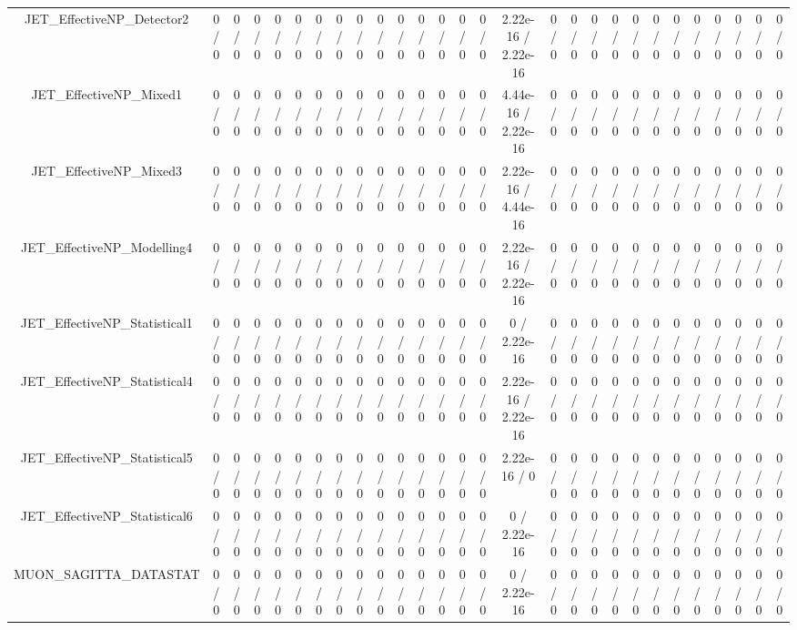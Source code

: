 \documentclass[10pt]{article}
\begin{document}
\begin{table}[htbp]
\begin{center}
\begin{tabular}{|c|c|c|c|c|c|c|c|c|c|c|c|c|c|c|c|c|c|c|c|c|c|c|c|c|c|c|c|}
  JET_EffectiveNP_Detector2 & 0 / 0 & 0 / 0 & 0 / 0 & 0 / 0 & 0 / 0 & 0 / 0 & 0 / 0 & 0 / 0 & 0 / 0 & 0 / 0 & 0 / 0 & 0 / 0 & 0 / 0 & 0 / 0 & 2.22e-16 / 2.22e-16 & 0 / 0 & 0 / 0 & 0 / 0 & 0 / 0 & 0 / 0 & 0 / 0 & 0 / 0 & 0 / 0 & 0 / 0 & 0 / 0 & 0 / 0 & 0 / 0 \\ 
  JET_EffectiveNP_Mixed1 & 0 / 0 & 0 / 0 & 0 / 0 & 0 / 0 & 0 / 0 & 0 / 0 & 0 / 0 & 0 / 0 & 0 / 0 & 0 / 0 & 0 / 0 & 0 / 0 & 0 / 0 & 0 / 0 & 4.44e-16 / 2.22e-16 & 0 / 0 & 0 / 0 & 0 / 0 & 0 / 0 & 0 / 0 & 0 / 0 & 0 / 0 & 0 / 0 & 0 / 0 & 0 / 0 & 0 / 0 & 0 / 0 \\ 
  JET_EffectiveNP_Mixed3 & 0 / 0 & 0 / 0 & 0 / 0 & 0 / 0 & 0 / 0 & 0 / 0 & 0 / 0 & 0 / 0 & 0 / 0 & 0 / 0 & 0 / 0 & 0 / 0 & 0 / 0 & 0 / 0 & 2.22e-16 / 4.44e-16 & 0 / 0 & 0 / 0 & 0 / 0 & 0 / 0 & 0 / 0 & 0 / 0 & 0 / 0 & 0 / 0 & 0 / 0 & 0 / 0 & 0 / 0 & 0 / 0 \\ 
  JET_EffectiveNP_Modelling4 & 0 / 0 & 0 / 0 & 0 / 0 & 0 / 0 & 0 / 0 & 0 / 0 & 0 / 0 & 0 / 0 & 0 / 0 & 0 / 0 & 0 / 0 & 0 / 0 & 0 / 0 & 0 / 0 & 2.22e-16 / 2.22e-16 & 0 / 0 & 0 / 0 & 0 / 0 & 0 / 0 & 0 / 0 & 0 / 0 & 0 / 0 & 0 / 0 & 0 / 0 & 0 / 0 & 0 / 0 & 0 / 0 \\ 
  JET_EffectiveNP_Statistical1 & 0 / 0 & 0 / 0 & 0 / 0 & 0 / 0 & 0 / 0 & 0 / 0 & 0 / 0 & 0 / 0 & 0 / 0 & 0 / 0 & 0 / 0 & 0 / 0 & 0 / 0 & 0 / 0 & 0 / 2.22e-16 & 0 / 0 & 0 / 0 & 0 / 0 & 0 / 0 & 0 / 0 & 0 / 0 & 0 / 0 & 0 / 0 & 0 / 0 & 0 / 0 & 0 / 0 & 0 / 0 \\ 
  JET_EffectiveNP_Statistical4 & 0 / 0 & 0 / 0 & 0 / 0 & 0 / 0 & 0 / 0 & 0 / 0 & 0 / 0 & 0 / 0 & 0 / 0 & 0 / 0 & 0 / 0 & 0 / 0 & 0 / 0 & 0 / 0 & 2.22e-16 / 2.22e-16 & 0 / 0 & 0 / 0 & 0 / 0 & 0 / 0 & 0 / 0 & 0 / 0 & 0 / 0 & 0 / 0 & 0 / 0 & 0 / 0 & 0 / 0 & 0 / 0 \\ 
  JET_EffectiveNP_Statistical5 & 0 / 0 & 0 / 0 & 0 / 0 & 0 / 0 & 0 / 0 & 0 / 0 & 0 / 0 & 0 / 0 & 0 / 0 & 0 / 0 & 0 / 0 & 0 / 0 & 0 / 0 & 0 / 0 & 2.22e-16 / 0 & 0 / 0 & 0 / 0 & 0 / 0 & 0 / 0 & 0 / 0 & 0 / 0 & 0 / 0 & 0 / 0 & 0 / 0 & 0 / 0 & 0 / 0 & 0 / 0 \\ 
  JET_EffectiveNP_Statistical6 & 0 / 0 & 0 / 0 & 0 / 0 & 0 / 0 & 0 / 0 & 0 / 0 & 0 / 0 & 0 / 0 & 0 / 0 & 0 / 0 & 0 / 0 & 0 / 0 & 0 / 0 & 0 / 0 & 0 / 2.22e-16 & 0 / 0 & 0 / 0 & 0 / 0 & 0 / 0 & 0 / 0 & 0 / 0 & 0 / 0 & 0 / 0 & 0 / 0 & 0 / 0 & 0 / 0 & 0 / 0 \\ 
  MUON_SAGITTA_DATASTAT & 0 / 0 & 0 / 0 & 0 / 0 & 0 / 0 & 0 / 0 & 0 / 0 & 0 / 0 & 0 / 0 & 0 / 0 & 0 / 0 & 0 / 0 & 0 / 0 & 0 / 0 & 0 / 0 & 0 / 2.22e-16 & 0 / 0 & 0 / 0 & 0 / 0 & 0 / 0 & 0 / 0 & 0 / 0 & 0 / 0 & 0 / 0 & 0 / 0 & 0 / 0 & 0 / 0 & 0 / 0 \\ 

\end{tabular}
\end{center}
\end{table}
\end{document}
